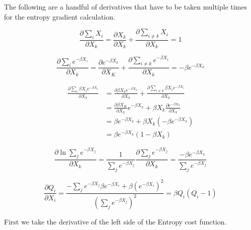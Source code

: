 \documentclass[smallextended]{svjour3}       %
\begin{document}
\noindent The following are a handful of derivatives that have to be taken multiple times for the entropy gradient calculation.

\begin{equation} \label{dx}
    \frac{\partial\sum_{i}X_i}{\partial X_{k}} = \frac{\partial X_{k}}{\partial X_{k}} + \frac{\partial \sum_{i \ne k} X_{i}}{\partial X_{k}} = 1
\end{equation}

\begin{equation} \label{dex}
    \frac{\partial \sum_{i}e^{-\beta X_{i}}}{\partial X_{k}} = \frac{\partial e^{-\beta X_{k}}}{\partial X_{K}} + \frac{\partial \sum_{i \ne k} e^{-\beta X_{i}}}{\partial X_{k}} = -\beta e^{-\beta X_{k}}
\end{equation}

\begin{equation} \label{dxex}
\begin{aligned}
    \frac{\partial \sum_{i}\beta X_{i} e^{-\beta X_{i}}}{\partial X_{k}}
    &= \frac{\partial \beta X_{k} e^{-\beta X_{k}}}{\partial X_{k}} + \frac{\partial \sum_{i \ne k} \beta X_{i} e^{-\beta X_{i}}}{\partial X_{k}} \\
    &= \frac{\partial \beta X_{K}}{\partial X_{k}} e^{-\beta X_{k}} + \beta X_{k} \frac{\partial e^{-\beta X_{k}}}{\partial X_{k}}\\
    &= \beta e^{-\beta X_{k}} + \beta X_{k} (-\beta e^{-\beta X_{k}})\\
    &= \beta e^{-\beta X_{k}}(1 - \beta X_{k})
\end{aligned}
\end{equation}

\begin{equation} \label{dlne}
    \frac{\partial \ln{\sum_{j} e^{-\beta X_{j}}}}{\partial X_{k}} = \frac{1}{\sum_{j} e^{-\beta X_{j}}} \frac{\partial \sum_{j} e^{-\beta X_{j}}}{\partial X_{k}} = \frac{-\beta e^{-\beta X_{k}}}{\sum_{j}e^{-\beta X_{j}}}
\end{equation}

\begin{equation} \label{qderiv}
    \frac{\partial Q_{i}}{\partial X_{i}} = \frac{-\sum_{j} e^{-\beta X_{j}} \beta e^{-\beta X_{i}} + \beta (e^{-\beta X_{i}})^2} {(\sum_{j}e^{-\beta X_{j}})^2} = \beta Q_{i} \left(Q_{i} - 1\right)
\end{equation}

\noindent First we take the derivative of the left side of the Entropy cost function.
\end{document}
